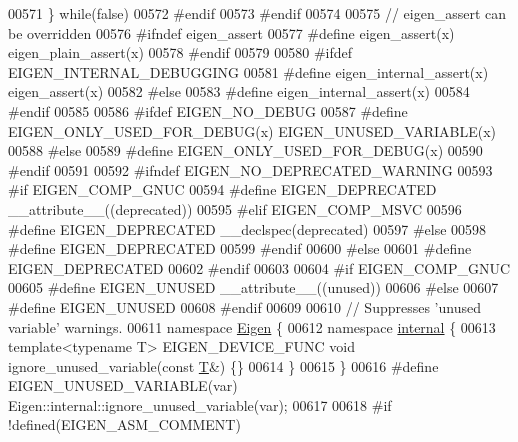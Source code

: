 \begin{DoxyCode}
00571 \textcolor{preprocessor}{      \} while(false)}
00572 \textcolor{preprocessor}{  #endif}
00573 \textcolor{preprocessor}{#endif}
00574 
00575 \textcolor{comment}{// eigen\_assert can be overridden}
00576 \textcolor{preprocessor}{#ifndef eigen\_assert}
00577 \textcolor{preprocessor}{#define eigen\_assert(x) eigen\_plain\_assert(x)}
00578 \textcolor{preprocessor}{#endif}
00579 
00580 \textcolor{preprocessor}{#ifdef EIGEN\_INTERNAL\_DEBUGGING}
00581 \textcolor{preprocessor}{#define eigen\_internal\_assert(x) eigen\_assert(x)}
00582 \textcolor{preprocessor}{#else}
00583 \textcolor{preprocessor}{#define eigen\_internal\_assert(x)}
00584 \textcolor{preprocessor}{#endif}
00585 
00586 \textcolor{preprocessor}{#ifdef EIGEN\_NO\_DEBUG}
00587 \textcolor{preprocessor}{#define EIGEN\_ONLY\_USED\_FOR\_DEBUG(x) EIGEN\_UNUSED\_VARIABLE(x)}
00588 \textcolor{preprocessor}{#else}
00589 \textcolor{preprocessor}{#define EIGEN\_ONLY\_USED\_FOR\_DEBUG(x)}
00590 \textcolor{preprocessor}{#endif}
00591 
00592 \textcolor{preprocessor}{#ifndef EIGEN\_NO\_DEPRECATED\_WARNING}
00593 \textcolor{preprocessor}{  #if EIGEN\_COMP\_GNUC}
00594 \textcolor{preprocessor}{    #define EIGEN\_DEPRECATED \_\_attribute\_\_((deprecated))}
00595 \textcolor{preprocessor}{  #elif EIGEN\_COMP\_MSVC}
00596 \textcolor{preprocessor}{    #define EIGEN\_DEPRECATED \_\_declspec(deprecated)}
00597 \textcolor{preprocessor}{  #else}
00598 \textcolor{preprocessor}{    #define EIGEN\_DEPRECATED}
00599 \textcolor{preprocessor}{  #endif}
00600 \textcolor{preprocessor}{#else}
00601 \textcolor{preprocessor}{  #define EIGEN\_DEPRECATED}
00602 \textcolor{preprocessor}{#endif}
00603 
00604 \textcolor{preprocessor}{#if EIGEN\_COMP\_GNUC}
00605 \textcolor{preprocessor}{#define EIGEN\_UNUSED \_\_attribute\_\_((unused))}
00606 \textcolor{preprocessor}{#else}
00607 \textcolor{preprocessor}{#define EIGEN\_UNUSED}
00608 \textcolor{preprocessor}{#endif}
00609 
00610 \textcolor{comment}{// Suppresses 'unused variable' warnings.}
00611 \textcolor{keyword}{namespace }\hyperlink{namespace_eigen}{Eigen} \{
00612   \textcolor{keyword}{namespace }\hyperlink{namespaceinternal}{internal} \{
00613     \textcolor{keyword}{template}<\textcolor{keyword}{typename} T> EIGEN\_DEVICE\_FUNC \textcolor{keywordtype}{void} ignore\_unused\_variable(\textcolor{keyword}{const} \hyperlink{group___sparse_core___module_class_eigen_1_1_triplet}{T}&) \{\}
00614   \}
00615 \}
00616 \textcolor{preprocessor}{#define EIGEN\_UNUSED\_VARIABLE(var) Eigen::internal::ignore\_unused\_variable(var);}
00617 
00618 \textcolor{preprocessor}{#if !defined(EIGEN\_ASM\_COMMENT)}

\end{DoxyCode}
